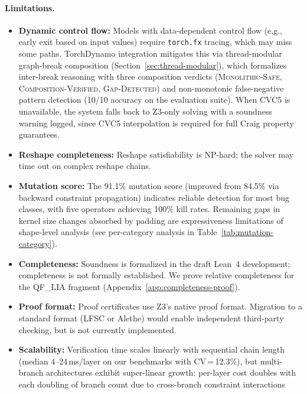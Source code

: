 \documentclass[11pt]{article}
\begin{document}
\paragraph{Limitations.}
\begin{itemize}[leftmargin=2em]
  \item \textbf{Dynamic control flow:} Models with data-dependent
    control flow (e.g., early exit based on input values) require
    \texttt{torch.fx} tracing, which may miss some paths.
    TorchDynamo integration mitigates this via thread-modular
    graph-break composition (Section~\ref{sec:thread-modular}),
    which formalizes inter-break reasoning with three composition
    verdicts (\textsc{Monolithic-Safe}, \textsc{Composition-Verified},
    \textsc{Gap-Detected}) and non-monotonic false-negative pattern
    detection (10/10 accuracy on the evaluation suite).
    When CVC5 is unavailable, the system
    falls back to Z3-only solving with a soundness warning logged,
    since CVC5 interpolation is required for full Craig property
    guarantees.
  \item \textbf{Reshape completeness:} Reshape satisfiability is
    NP-hard; the solver may time out on complex reshape chains.
  \item \textbf{Mutation score:} The 91.1\% mutation score (improved
    from 84.5\% via backward constraint propagation) indicates
    reliable detection for most bug classes, with five operators
    achieving 100\% kill rates.  Remaining gaps
    in kernel size changes absorbed by
    padding are expressiveness limitations of shape-level analysis
    (see per-category analysis in
    Table~\ref{tab:mutation-category}).
  \item \textbf{Completeness:} Soundness is formalized in the draft
    Lean~4 development;
    completeness is not formally established. We prove relative
    completeness for the QF\_LIA fragment
    (Appendix~\ref{app:completeness-proof}).
  \item \textbf{Proof format:} Proof certificates use Z3's native
    proof format.  Migration to a standard format (LFSC or Alethe)
    would enable independent third-party checking, but is not
    currently implemented.
  \item \textbf{Scalability:} Verification time scales linearly
    with sequential chain length (median 4--24\,ms/layer on our benchmarks
    with CV\,=\,12.3\%), but multi-branch architectures exhibit
    super-linear growth: per-layer cost doubles with each doubling
    of branch count due to cross-branch constraint interactions

\end{itemize}
\end{document}
